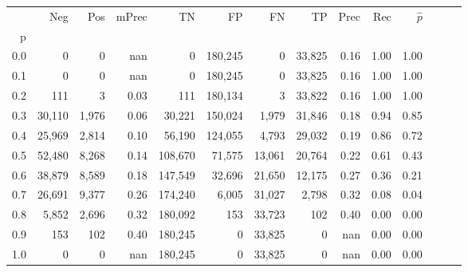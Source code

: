 \begin{tabular}{rrrrrrrrrrrrrr}
\toprule
{} &     Neg &    Pos & mPrec &       TN &       FP &      FN &      TP &  Prec &   Rec & $\hat{p}$ \\
p   &         &        &       &          &          &         &         &       &       &           \\
\midrule
0.0 &       0 &      0 &   nan &        0 &  180,245 &       0 &  33,825 &  0.16 &  1.00 &      1.00 \\
0.1 &       0 &      0 &   nan &        0 &  180,245 &       0 &  33,825 &  0.16 &  1.00 &      1.00 \\
0.2 &     111 &      3 &  0.03 &      111 &  180,134 &       3 &  33,822 &  0.16 &  1.00 &      1.00 \\
0.3 &  30,110 &  1,976 &  0.06 &   30,221 &  150,024 &   1,979 &  31,846 &  0.18 &  0.94 &      0.85 \\
0.4 &  25,969 &  2,814 &  0.10 &   56,190 &  124,055 &   4,793 &  29,032 &  0.19 &  0.86 &      0.72 \\
0.5 &  52,480 &  8,268 &  0.14 &  108,670 &   71,575 &  13,061 &  20,764 &  0.22 &  0.61 &      0.43 \\
0.6 &  38,879 &  8,589 &  0.18 &  147,549 &   32,696 &  21,650 &  12,175 &  0.27 &  0.36 &      0.21 \\
0.7 &  26,691 &  9,377 &  0.26 &  174,240 &    6,005 &  31,027 &   2,798 &  0.32 &  0.08 &      0.04 \\
0.8 &   5,852 &  2,696 &  0.32 &  180,092 &      153 &  33,723 &     102 &  0.40 &  0.00 &      0.00 \\
0.9 &     153 &    102 &  0.40 &  180,245 &        0 &  33,825 &       0 &   nan &  0.00 &      0.00 \\
1.0 &       0 &      0 &   nan &  180,245 &        0 &  33,825 &       0 &   nan &  0.00 &      0.00 \\
\bottomrule
\end{tabular}
